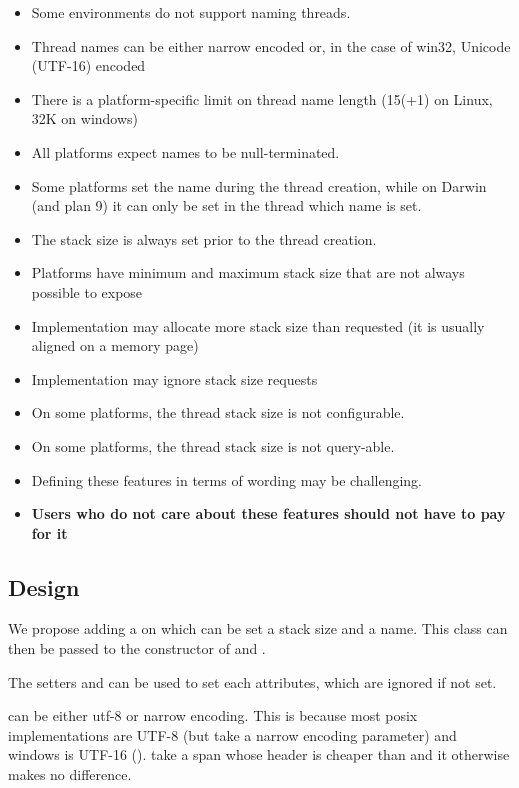 \documentclass{wg21}
\begin{document}
\begin{itemize}
\item Some environments do not support naming threads.
\item Thread names can be either narrow encoded or, in the case of win32, Unicode (UTF-16) encoded
\item There is a platform-specific limit on thread name length (15(+1) on Linux, 32K on windows)
\item All platforms expect names to be null-terminated.
\item Some platforms set the name during the thread creation, while on Darwin (and plan 9) it can only be set in the thread which name is set.
\item The stack size is always set prior to the thread creation.
\item Platforms have minimum and maximum stack size that are not always possible to expose
\item Implementation may allocate more stack size than requested (it is usually aligned on a memory page) 
\item Implementation may ignore stack size requests
\item On some platforms, the thread stack size is not configurable.
\item On some platforms, the thread stack size is not query-able.
\item Defining these features in terms of wording may be challenging.
\item \textbf{Users who do not care about these features should not have to pay for it}
\end{itemize}

\subsection{Design}

We propose adding a  on which can be set a stack size and a name.
This class can then be passed to the constructor of  and .

The setters  and  can be used to set each attributes, which are ignored
if not set.

 can be either utf-8 or narrow encoding. This is because most posix implementations are UTF-8 (but take a narrow encoding parameter) and  windows is UTF-16 ().
 take a span whose header is cheaper than  and it otherwise makes no difference.
\end{document}
